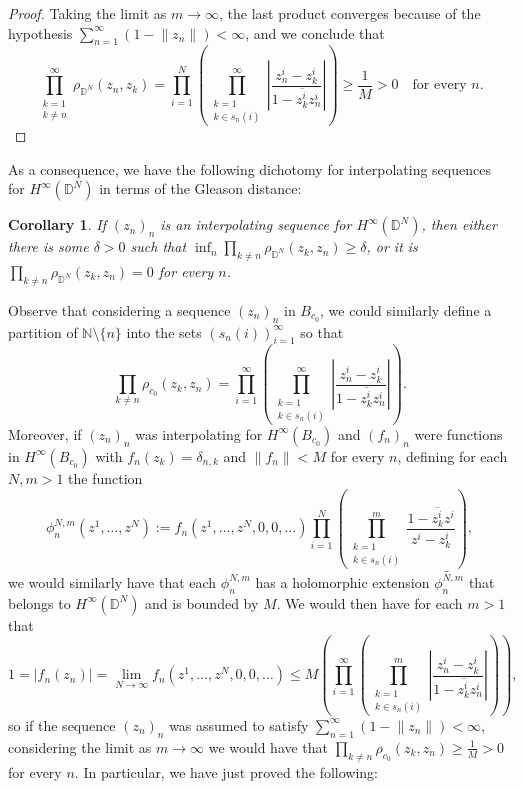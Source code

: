 \documentclass[preprint,12pt,number]{elsarticle}
\newtheorem{corollary}[teo]{Corollary}
\newcommand{\N}{\mathbb{N}}
\newcommand{\D}{\mathbb{D}}
\begin{document}
\begin{proof}
Taking the limit as $m \to \infty$, the last product converges because of the hypothesis $\sum_{n=1}^\infty(1-\lVert z_n\rVert)<\infty$, and we conclude that 
\[
\prod_{\substack{k=1\\k\neq n}}^\infty \rho_{\D^N}(z_n,z_k)=\prod_{i=1}^N\left(\prod_{\substack{k=1\\k\in s_n(i)}}^\infty \left|\frac{z_n^i-z_k^i}{1-\overline{z_k^i}z_n^i}\right| \right)\geq \frac{1}{M}>0\quad \text{for every } n.
\]
\end{proof}

As a consequence, we have the following dichotomy for interpolating sequences for $H^\infty(\D^N)$ in terms of the Gleason distance:

\begin{corollary}
    If $(z_n)_n$ is an interpolating sequence for $H^\infty(\D^N)$, then either there is some $\delta>0$ such that $\inf_n \prod_{k\neq n}\rho_{\D^N}(z_k,z_n)\geq \delta $, or it is $\prod_{k\neq n}\rho_{\D^N}(z_k,z_n)=0$ for every $n$.
\end{corollary}

Observe that considering a sequence $(z_n)_n$ in $B_{c_0}$, we could similarly define a partition of $\N\setminus\{n\}$ into the sets $(s_n(i))_{i=1}^\infty$ so that 
\[
\prod_{k\neq n}\rho_{c_0}(z_k,z_n)=\prod_{i=1}^\infty\left(\prod_{\substack{k=1\\k\in s_n(i)}}^\infty \left|\frac{z_n^i-z_k^i}{1-\overline{z_k^i}z_n^i}\right| \right).
\] 
Moreover, if $(z_n)_n$ was interpolating for $H^\infty(B_{c_0})$ and $(f_n)_n$ were functions in $H^\infty(B_{c_0})$ with $f_n(z_k)=\delta_{n,k}$ and $\lVert f_n \rVert<M$ for every $n$, defining for each $N,m>1$ the function 
\[
\phi_n^{N,m}(z^1,\dots,z^N):=f_n(z^1,\dots,z^N,0,0,\dots)\prod_{i=1}^N\left(\prod_{\substack{k=1\\k\in s_n(i)}}^m \frac{1-\overline{z_k^i}z^i}{z^i-z_k^i} \right),
\] 
we would similarly have that each $\phi_n^{N,m}$ has a holomorphic extension $\widetilde{\phi_n^{N,m}}$ that belongs to $H^\infty(\D^N)$ and is bounded by $M$. We would then have for each $m>1$ that 
\[
1=|f_n(z_n)|=\lim_{N\to\infty}f_n(z^1,\dots,z^N,0,0,\dots)\leq M \left(\prod_{i=1}^\infty\left(\prod_{\substack{k=1\\k\in s_n(i)}}^m \left|\frac{z_n^i-z_k^i}{1-\overline{z_k^i}z_n^i}\right| \right)\right),
\] 
so if the sequence $(z_n)_n$  was assumed to satisfy $\sum_{n=1}^\infty(1-\lVert z_n\rVert)<\infty$, considering the limit as $m \to \infty$ we would have that $\prod_{k\neq n}\rho_{c_0}(z_k,z_n)\geq \frac{1}{M}>0$ for every $n$. In particular, we have just proved the following: 
\end{document}
